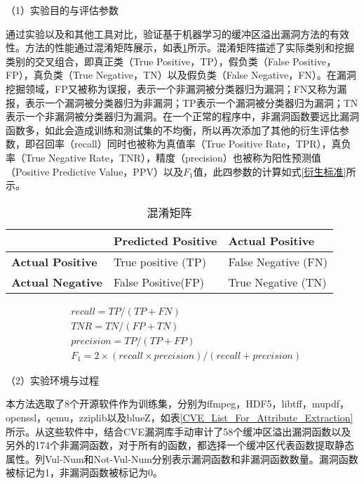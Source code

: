 {（1）实验目的与评估参数

通过实验以及和其他工具对比，验证基于机器学习的缓冲区溢出漏洞方法的有效性。方法的性能通过混淆矩阵展示，如表\ref{confusion_matrix}所示。混淆矩阵描述了实际类别和挖掘类别的交叉组合，即真正类（True Positive，TP），假负类（False Positive，FP），真负类（True Negative，TN）以及假负类（False Negative，FN）。在漏洞挖掘领域，FP又被称为误报，表示一个非漏洞被分类器归为漏洞；FN又称为漏报，表示一个漏洞被分类器归为非漏洞；TP表示一个漏洞被分类器归为漏洞；TN表示一个非漏洞被分类器归为漏洞。在一个正常的程序中，非漏洞函数要远比漏洞函数多，如此会造成训练和测试集的不均衡，所以再次添加了其他的衍生评估参数，即召回率（recall）同时也被称为真值率（True Positive Rate，TPR），真负率（True Negative Rate，TNR），精度（precision）也被称为阳性预测值（Positive Predictive Value，PPV）以及$F_1$值，此四参数的计算如式\ref{衍生标准}所示。

\begin{table}[ht]
\begin{center}
\caption{混淆矩阵} \label{confusion_matrix}
\begin{small}
\begin{tabular}{lll}
\hline
 & {\bf Predicted Positive} & {\bf Actual Positive}\\ \hline
{\bf Actual Positive} & True positive (TP) & False Negative (FN)\\ \hline
{\bf Actual Negative} & False Positive(FP) & True Negative (TN)\\ \hline
\end{tabular}
\end{small}
\end{center}
\end{table}

\begin{equation}
\begin{split}
\label{衍生标准}
& recall = TP/(TP+FN) \\
& TNR = TN/(FP+TN) \\
& precision = TP/(TP+FP) \\
& F_1 = 2 \times (recall \times precision)/(recall + precision)
\end{split}
\end{equation}

（2）实验环境与过程

本方法选取了8个开源软件作为训练集，分别为ffmpeg，HDF5，libtff，mupdf，openssl，qemu，zziplib以及blueZ，如表\ref{CVE_List_For_Attribute_Extraction}所示。从这些软件中，结合CVE漏洞库手动审计了58个缓冲区溢出漏洞函数以及另外的174个非漏洞函数，对于所有的函数，都选择一个缓冲区代表函数提取静态属性。列Vul-Num和Not-Vul-Num分别表示漏洞函数和非漏洞函数数量。漏洞函数被标记为1，非漏洞函数被标记为0。

}
